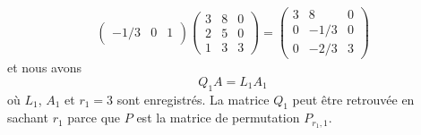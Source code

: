 \begin{example}
\begin{equation}
\begin{pmatrix}
            -1/3    &   0    &   1
        \end{pmatrix}
        \begin{pmatrix}
            3    &   8    &   0    \\
            2    &   5    &   0    \\
            1    &   3    &   3
        \end{pmatrix}=
        \begin{pmatrix}
            3    &   8    &   0    \\
            0    &   -1/3    &   0    \\
            0    &   -2/3    &   3
        \end{pmatrix}
    \end{equation}
    et nous avons 
    \begin{equation}
        Q_1A=L_1A_1
    \end{equation}
    où \( L_1\), \( A_1\) et \( r_1=3\) sont enregistrés. La matrice \( Q_1\) peut être retrouvée en sachant \( r_1\) parce que \( P\) est la matrice de permutation \( P_{r_1,1}\).


\end{example}
